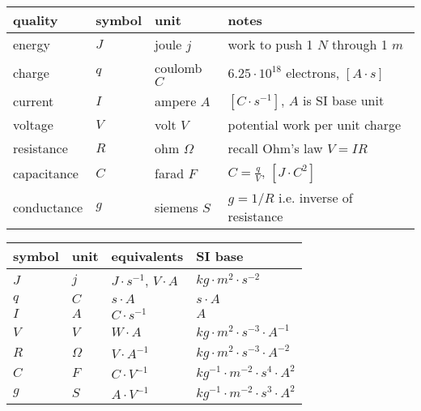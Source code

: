 \begin{table*}[htp!]
    \begin{center}

    \begin{tabular}{llll}
        \hline
        quality & symbol & unit  & notes \\
        \hline
        energy     & $J$ & joule   $j$  & work to push 1 $N$ through 1 $m$ \\
        charge     & $q$ & coulomb $C$  & $6.25\cdot10^{18}$ electrons, $[A\cdot s]$ \\
        current    & $I$ & ampere  $A$  & $[C\cdot s^{-1}]$, $A$ is SI base unit\\
        voltage    & $V$ & volt    $V$  & potential work per unit charge \\
        resistance & $R$ & ohm $\Omega$ & recall Ohm's law $V=IR$ \\
        capacitance& $C$ & farad   $F$  & $C=\frac{q}{V}$, $[J\cdot C^{2}]$\\
        conductance& $g$ & siemens $S$  & $g=1/R$ i.e. inverse of resistance \\
        \hline
    \end{tabular}

    \begin{tabular}{llll}
        \hline
        symbol & unit & equivalents & SI base \\
        \hline
        $J$    & $j$      &  $J\cdot s^{-1}$, $V\cdot A$ &
            $kg\cdot m^{2}\cdot s^{-2}$ \\

        $q$    & $C$      & $s\cdot A$ &
            $s\cdot A$ \\

        $I$    & $A$  & $C\cdot s^{-1}$ &
            $A$ \\

        $V$    & $V$      & $W\cdot A$ &
            $kg\cdot m^{2}\cdot s^{-3}\cdot A^{-1}$ \\

        $R$    & $\Omega$ & $V\cdot A^{-1}$ &
            $kg\cdot m^{2}\cdot s^{-3}\cdot A^{-2}$ \\

        $C$    & $F$      & $C\cdot V^{-1}$  &
            $kg^{-1}\cdot m^{-2}\cdot s^{4}\cdot A^{2}$ \\
        $g$    & $S$      & $A\cdot V^{-1}$  &
            $kg^{-1}\cdot m^{-2}\cdot s^3\cdot A^2$ \\
        \hline
    \end{tabular}

    \end{center}
    \caption{Symbols and quantities.}
\end{table*}
